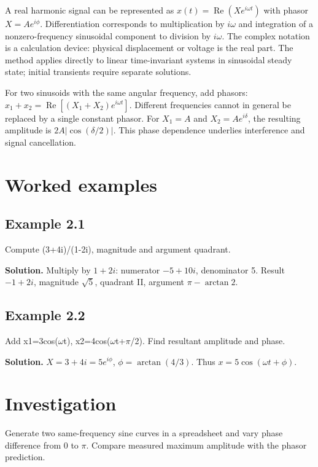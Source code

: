 \documentclass[11pt,a4paper,openany]{book}
\begin{document}
A real harmonic signal can be represented as $x(t)=\operatorname{Re}(Xe^{i\omega t})$ with phasor $X=Ae^{i\phi}$. Differentiation corresponds to multiplication by $i\omega$ and integration of a nonzero-frequency sinusoidal component to division by $i\omega$. The complex notation is a calculation device: physical displacement or voltage is the real part. The method applies directly to linear time-invariant systems in sinusoidal steady state; initial transients require separate solutions.

For two sinusoids with the same angular frequency, add phasors: $x_1+x_2=\operatorname{Re}[(X_1+X_2)e^{i\omega t}]$. Different frequencies cannot in general be replaced by a single constant phasor. For $X_1=A$ and $X_2=Ae^{i\delta}$, the resulting amplitude is $2A|\cos(\delta/2)|$. This phase dependence underlies interference and signal cancellation.
\begin{center}
\end{center}
\section{Worked examples}
\subsection*{Example 2.1}
Compute (3+4i)/(1-2i), magnitude and argument quadrant.

\textbf{Solution.} Multiply by $1+2i$: numerator $-5+10i$, denominator 5. Result $-1+2i$, magnitude $\sqrt5$, quadrant II, argument $\pi-\arctan2$.
\subsection*{Example 2.2}
Add x1=3cos(\ensuremath{\omega}t), x2=4cos(\ensuremath{\omega}t+\ensuremath{\pi}/2). Find resultant amplitude and phase.

\textbf{Solution.} $X=3+4i=5e^{i\phi}$, $\phi=\arctan(4/3)$. Thus $x=5\cos(\omega t+\phi)$.
\section{Investigation}
Generate two same-frequency sine curves in a spreadsheet and vary phase difference from 0 to \ensuremath{\pi}. Compare measured maximum amplitude with the phasor prediction.
\end{document}
